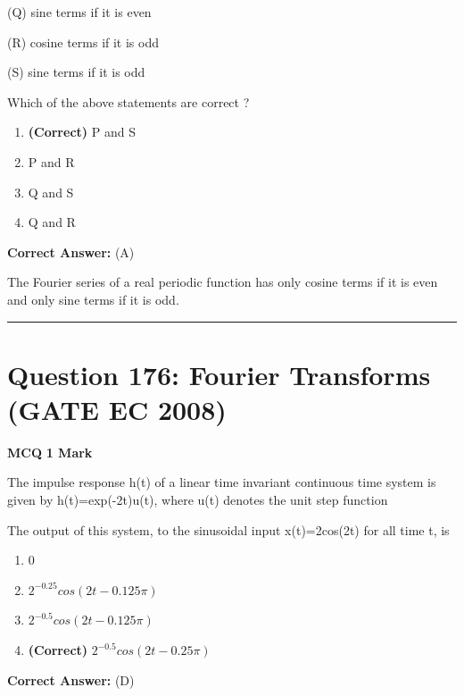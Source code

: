 \documentclass[11pt,a4paper]{article}
\begin{document}
(Q) sine terms if it is even 

(R) cosine terms if it is odd 

(S) sine terms if it is odd 

Which of the above statements are correct ?


\begin{enumerate}[label=(\Alph*)]
    \item \textbf{(Correct)} P and S
    \item P and R
    \item Q and S
    \item Q and R
\end{enumerate}

\noindent \textbf{Correct Answer:} (A)

\begin{tcolorbox}[solbox, title=Detailed Solution -- Question 175]
The Fourier series of a real periodic function has
only cosine terms if it is even and only sine terms
if it is odd.
\end{tcolorbox}

\vspace{1.5em}
\hrule
\vspace{1.5em}

\section*{Question 176: Fourier Transforms (GATE EC 2008)}
\noindent \textbf{\color{primary}MCQ} \hfill \textbf{\color{secondary}1 Mark}


\noindent The impulse response h(t) of a linear time invariant continuous time system is
given by  
h(t)=exp(-2t)u(t), where u(t) denotes the unit step function 

The output of this system, to the sinusoidal input x(t)=2cos(2t) for all time t, is


\begin{enumerate}[label=(\Alph*)]
    \item 0
    \item $2^{-0.25}cos(2t-0.125\pi)$
    \item $2^{-0.5}cos(2t-0.125\pi)$
    \item \textbf{(Correct)} $2^{-0.5}cos(2t-0.25\pi)$
\end{enumerate}

\noindent \textbf{Correct Answer:} (D)
\end{document}
